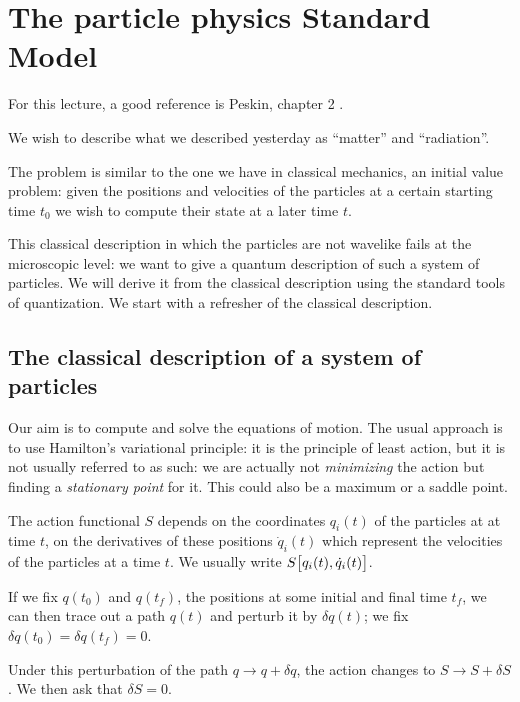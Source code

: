 \documentclass[main.tex]{subfiles}
\begin{document}
\chapter{The particle physics Standard Model}


For this lecture, a good reference is Peskin, chapter 2 \cite{peskinConceptsElementaryParticle2019}.

We wish to describe what we described yesterday as ``matter'' and ``radiation''.

The problem is similar to the one we have in classical mechanics, an initial value problem: given the positions and velocities of the particles at a certain starting time \(t_0 \) we wish to compute their state at a later time \(t\).

This classical description in which the particles are not wavelike fails at the microscopic level: we want to give a quantum description of such a system of particles. 
We will derive it from the classical description using the standard tools of quantization. 
We start with a refresher of the classical description.

\section{The classical description of a system of particles}

Our aim is to compute and solve the equations of motion.
The usual approach is to use Hamilton's variational principle: it is the principle of least action, but it is not usually referred to as such: we are actually not \emph{minimizing} the action but finding a \emph{stationary point} for it.
This could also be a maximum or a saddle point.

The action functional \(S\) depends on the coordinates \(q_i(t)\) of the particles at at time \(t\), on the derivatives of these positions \(\dot{q}_{i}(t)\) which represent the velocities of the particles at a time \(t\). 
We usually write \(S \qty[q_{i}(t), \dot{q}_{i}(t)]\). 

If we fix \(q(t_0 )\) and \(q(t_{f})\), the positions at some initial and final time \(t_f\), we can then trace out a path \(q(t)\) and perturb it by \(\delta q(t)\); we fix \(\delta q(t_0 ) = \delta q(t_f) = 0\). 

Under this perturbation of the path \(q \rightarrow q + \delta q\), the action changes to \(S \rightarrow S + \delta S\). 
We then ask that \(\delta S =0\). 
\end{document}
